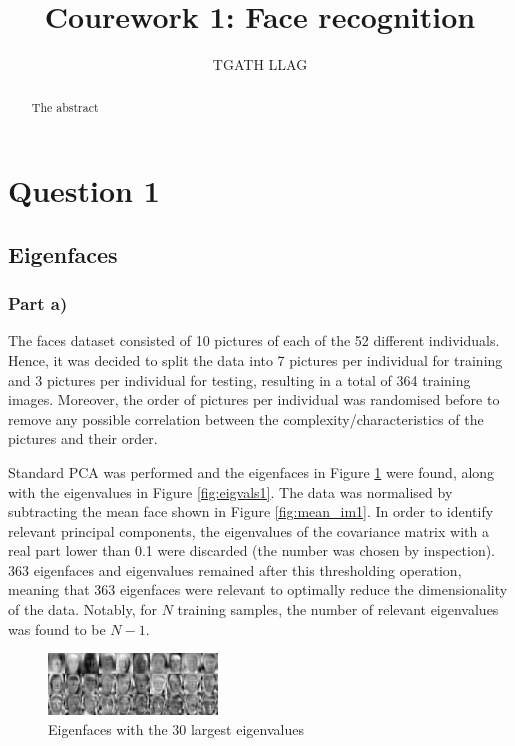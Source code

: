 \documentclass[10pt,technote]{IEEEtran}
\title{Courework 1: Face recognition }
\author{TGATH LLAG}
\begin{document}
\maketitle
\begin{abstract}
The abstract
\end{abstract}

\section{Question 1}
\subsection{Eigenfaces}
\subsubsection{Part a)}
The faces dataset consisted of 10 pictures of each of the 52 different individuals. Hence, it was decided to split the data into 7 pictures per individual for training and 3 pictures per individual for testing, resulting in a total of 364 training images. Moreover, the order of pictures per individual was randomised before to remove any possible correlation between the complexity/characteristics of the pictures and their order.

Standard PCA was performed and the eigenfaces in Figure \ref{fig:eigfaces1} were found, along with the eigenvalues in Figure \ref{fig:eigvals1}. The data was normalised by subtracting the mean face shown in Figure \ref{fig:mean_im1}. In order to identify relevant principal components, the eigenvalues of the covariance matrix with a real part lower than 0.1 were discarded (the number was chosen by inspection). 363 eigenfaces and eigenvalues remained after this thresholding operation, meaning that 363 eigenfaces were relevant to optimally reduce the dimensionality of the data. Notably, for $N$ training samples, the number of relevant eigenvalues was found to be $N - 1$. 

\begin{figure}
    \centering
    \includegraphics[width=0.4\textwidth]{../results/ex1a/eigenfaces.png}
    \caption{Eigenfaces with the 30 largest eigenvalues}
    \label{fig:eigfaces1}
\end{figure}
\end{document}
